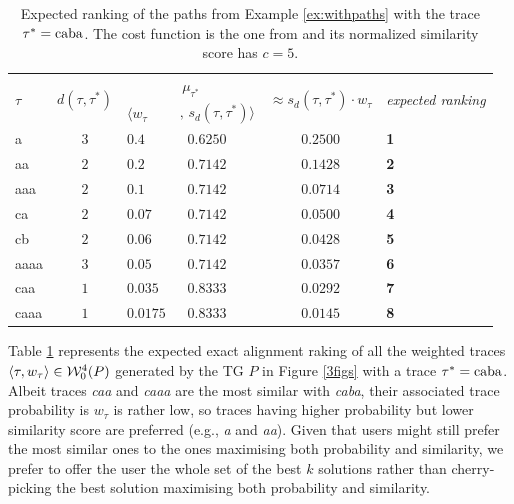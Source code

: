 \begin{table}[!t]
\centering
\caption{Expected ranking of the paths from Example \ref{ex:withpaths} with the trace $\tau^*=\textup{caba}$. The cost function is the one from \cite{LeoniM17} and its normalized similarity score has $c=5$.}\label{tab:expected}
\begin{tabular}{lc|ll|cl}
	\toprule
	
	\multirow{2}{*}{$\tau$} &
	\multirow{2}{*}{$d(\tau,\tau^*)$} &
	\multicolumn{2}{c|}{$\mu_{\tau^*}$} &
	 \multirow{2}{*}{$\approx s_d(\tau,\tau^*)\cdot w_\tau$} & \multirow{2}{*}{\textit{expected ranking}}\\
	
	\cline{3-4} &&  $\langle w_\tau$ &  $,\,s_d(\tau,\tau^*)\rangle $ &&\\
	
	\midrule
	{a}  & $3$ & $0.4$ & $\;\; 0.6250$  & $0.2500$ & \textbf{1}\\
	{aa}  & $2$ & $0.2$ & $\;\; 0.7142$ & $0.1428$ & \textbf{2}\\
	{aaa}  & $2$ & $0.1$ & $\;\; 0.7142$ & $0.0714$ & \textbf{3}\\
	{ca}  & $2$ & $0.07$ & $\;\; 0.7142$ & $0.0500$ & \textbf{4}\\
	{cb}  & $2$ & $0.06$ & $\;\; 0.7142$ & $0.0428$ & \textbf{5}\\
	{aaaa}  & $3$ & $0.05$ & $\;\; 0.7142$ & $0.0357$ & \textbf{6}\\
	{caa}  & $1$ & $0.035$ & $\;\; 0.8333$ & $0.0292$ &  \textbf{7}\\
	{caaa}  & $1$  & $0.0175$ & $\;\; 0.8333$ & $0.0145$ & \textbf{8}\\
	\bottomrule
\end{tabular}
\end{table}
\begin{example}\label{ex:rankingTaus}
Table \ref{tab:expected} represents the expected exact alignment raking of all the weighted traces $\braket{\tau,w_\tau}\in\mathcal{W}_0^4(P)$ generated by the TG $P$ in Figure \ref{3figs} with a trace $\tau^*=\textup{caba}$.  Albeit traces \textit{caa} and \textit{caaa} are the most similar with \textit{caba}, their associated trace probability is $w_\tau$ is rather low, so traces having higher probability but lower similarity score are preferred (e.g., \textit{a} and \textit{aa}). Given that users might still prefer the most similar ones to the ones maximising both probability and similarity, we prefer to offer the user the whole set of the best $k$ solutions rather than cherry-picking the best solution maximising both probability and similarity.
\end{example}

